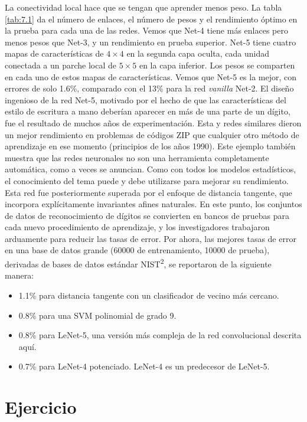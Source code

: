 La conectividad local hace que se tengan que aprender menos peso. La tabla \ref{tab:7.1} da el número de enlaces, el número de pesos y el rendimiento óptimo en la prueba para cada una de las redes. Vemos que Net-4 tiene más enlaces pero menos pesos que Net-3, y un rendimiento en prueba superior. Net-5 tiene cuatro mapas de características de $4 \times 4$ en la segunda capa oculta, cada unidad conectada a un parche local de $5 \times 5$ en la capa inferior. Los pesos se comparten en cada uno de estos mapas de características. Vemos que Net-5 es la mejor, con errores de solo 1.6\%, comparado con el 13\% para la red \textit{vanilla} Net-2. El diseño ingenioso de la red Net-5, motivado por el hecho de que las características del estilo de escritura a mano deberían aparecer en más de una parte de un dígito, fue el resultado de muchos años de experimentación. Esta y redes similares dieron un mejor rendimiento en problemas de códigos ZIP que cualquier otro método de aprendizaje en ese momento (principios de los años 1990). Este ejemplo también muestra que las redes neuronales no son una herramienta completamente automática, como a veces se anuncian. Como con todos los modelos estadísticos, el conocimiento del tema puede y debe utilizarse para mejorar su rendimiento. \\

Esta red fue posteriormente superada por el enfoque de distancia tangente, que incorpora explícitamente invariantes afines naturales. En este punto, los conjuntos de datos de reconocimiento de dígitos se convierten en bancos de pruebas para cada nuevo procedimiento de aprendizaje, y los investigadores trabajaron arduamente para reducir las tasas de error. Por ahora, las mejores tasas de error en una base de datos grande (60000 de entrenamiento, 10000 de prueba), derivadas de bases de datos estándar NIST\textsuperscript{2}, se reportaron de la siguiente manera:
\begin{itemize}
\item 1.1\% para distancia tangente con un clasificador de vecino más cercano.
\item 0.8\% para una SVM polinomial de grado 9.
\item 0.8\% para LeNet-5, una versión más compleja de la red convolucional descrita aquí.
\item 0.7\% para LeNet-4 potenciado. LeNet-4 es un predecesor de LeNet-5.
\end{itemize}



\section{Ejercicio}

